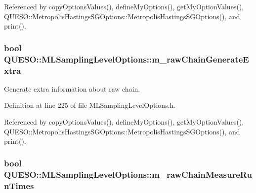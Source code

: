Referenced by copy\-Options\-Values(), define\-My\-Options(), get\-My\-Option\-Values(), Q\-U\-E\-S\-O\-::\-Metropolis\-Hastings\-S\-G\-Options\-::\-Metropolis\-Hastings\-S\-G\-Options(), and print().

\hypertarget{class_q_u_e_s_o_1_1_m_l_sampling_level_options_ab0dda87d92a759b277d07157def23174}{
\subsubsection[{m\-\_\-raw\-Chain\-Generate\-Extra}]{\setlength{\rightskip}{0pt plus 5cm}bool Q\-U\-E\-S\-O\-::\-M\-L\-Sampling\-Level\-Options\-::m\-\_\-raw\-Chain\-Generate\-Extra}}\label{class_q_u_e_s_o_1_1_m_l_sampling_level_options_ab0dda87d92a759b277d07157def23174}


Generate extra information about raw chain. 



Definition at line 225 of file M\-L\-Sampling\-Level\-Options.\-h.



Referenced by copy\-Options\-Values(), define\-My\-Options(), get\-My\-Option\-Values(), Q\-U\-E\-S\-O\-::\-Metropolis\-Hastings\-S\-G\-Options\-::\-Metropolis\-Hastings\-S\-G\-Options(), and print().

\hypertarget{class_q_u_e_s_o_1_1_m_l_sampling_level_options_ad93ee62195c418eedb55877009102cab}{
\subsubsection[{m\-\_\-raw\-Chain\-Measure\-Run\-Times}]{\setlength{\rightskip}{0pt plus 5cm}bool Q\-U\-E\-S\-O\-::\-M\-L\-Sampling\-Level\-Options\-::m\-\_\-raw\-Chain\-Measure\-Run\-Times}}\label{class_q_u_e_s_o_1_1_m_l_sampling_level_options_ad93ee62195c418eedb55877009102cab}


